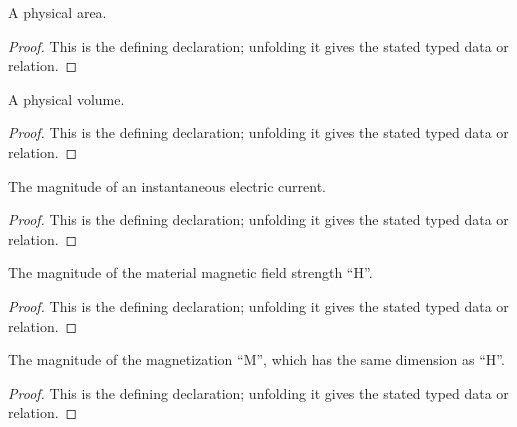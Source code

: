 \begin{definition}[PhysicalArea]
  \label{decl:physics:IPhO_2026_3_A_1:PhysicalArea}
  A physical area.
\end{definition}
\begin{proof}
  This is the defining declaration; unfolding it gives the stated typed data or relation.
\end{proof}

\begin{definition}[PhysicalVolume]
  \label{decl:physics:IPhO_2026_3_A_1:PhysicalVolume}
  A physical volume.
\end{definition}
\begin{proof}
  This is the defining declaration; unfolding it gives the stated typed data or relation.
\end{proof}

\begin{definition}[ElectricCurrentMagnitude]
  \label{decl:physics:IPhO_2026_3_A_1:ElectricCurrentMagnitude}
  The magnitude of an instantaneous electric current.
\end{definition}
\begin{proof}
  This is the defining declaration; unfolding it gives the stated typed data or relation.
\end{proof}

\begin{definition}[MagneticFieldStrengthMagnitude]
  \label{decl:physics:IPhO_2026_3_A_1:MagneticFieldStrengthMagnitude}
  The magnitude of the material magnetic field strength “H”.
\end{definition}
\begin{proof}
  This is the defining declaration; unfolding it gives the stated typed data or relation.
\end{proof}

\begin{definition}[MagnetizationMagnitude]
  \label{decl:physics:IPhO_2026_3_A_1:MagnetizationMagnitude}
  The magnitude of the magnetization “M”, which has the same dimension as “H”.
\end{definition}
\begin{proof}
  This is the defining declaration; unfolding it gives the stated typed data or relation.
\end{proof}

